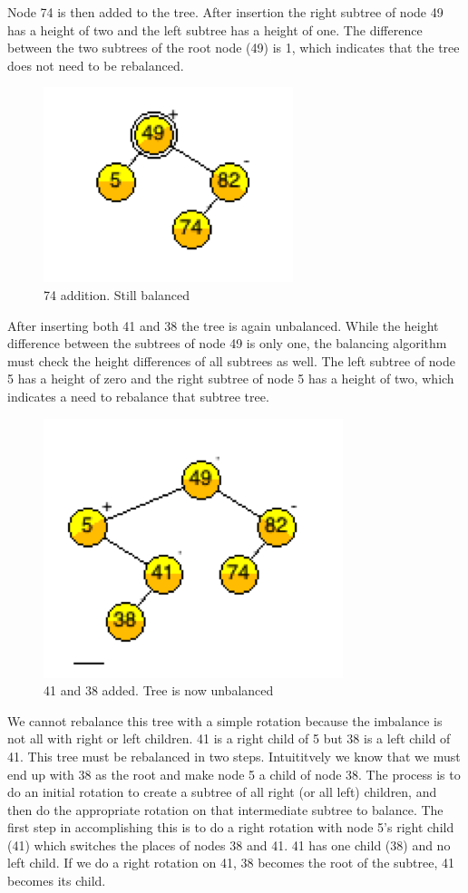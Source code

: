 Node 74 is then added to the tree. After insertion the right subtree of node 49 has a height of two and the left subtree has a height of one. The difference between the two subtrees of the root node (49) is 1,  which indicates that the tree does not need to be rebalanced.

\begin{figure}[H]
\centering
\includegraphics{pictures/tree3.png}
\caption{74 addition. Still balanced}
\label{fig:tree3}
\end{figure}

After inserting both 41 and 38 the tree is again unbalanced. While the height difference between the subtrees of node 49 is only one,  the balancing algorithm must check the height differences of all subtrees as well.  The left subtree of node 5 has a height of zero and the right subtree of node 5 has a height of two, which indicates a need to rebalance that subtree tree.

\begin{figure}[H]
\centering
\includegraphics{pictures/tree4.png}
\caption{41 and 38 added. Tree is now unbalanced}
\label{fig:tree4}
\end{figure}

We cannot rebalance this tree with a simple rotation because the imbalance is not all with right or left children.  41 is a right child of 5 but 38 is a left child of 41.  
This tree must be rebalanced in two steps.  Intuititvely we know that we must end up with  38 as the root and make node 5 a child of node 38. 
The process is to do an initial rotation to create a subtree of all right (or all left) children, and then do the appropriate rotation on that intermediate subtree to balance.
The first step in accomplishing this is to do a right rotation with node 5's right child (41) which switches the places of nodes 38 and 41.   41 has one child (38) and no left child.  If we do a right rotation on 41,  38 becomes the root of the subtree, 41 becomes its child.

